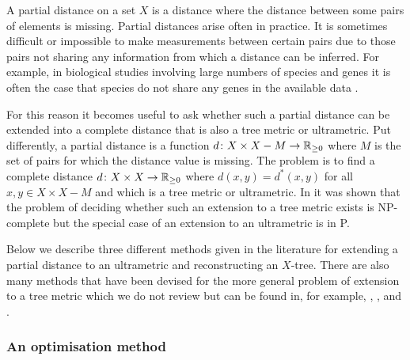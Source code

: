 A partial distance on a set $X$ is a distance where the distance between some
pairs of elements is missing.  Partial distances arise often in practice.  It
is sometimes difficult or impossible to make measurements between certain
pairs due to those pairs not sharing any information from which a distance can
be inferred.  For example, in biological studies involving large numbers of
species and genes it is often the case that species do not share any genes in
the available data \cite{criscuolo2008fastnj}.

For this reason it becomes useful to ask whether such a partial distance can
be extended into a complete distance that is also a tree metric or
ultrametric.  Put differently, a partial distance is a function $d \colon X
\times X - M \to {\mathbb R}_{\geq 0}$ where $M$ is the set of pairs for which the distance
value is missing.  The problem is to find a complete distance $d \colon X
\times X \to {\mathbb R}_{\geq 0}$ where $d(x,y) = d^*(x,y)$ for all $x,y \in X \times X - M$
and which is a tree metric or ultrametric.  In \citep{farach1995robust} it was
shown that the problem of deciding whether such an extension to a tree metric
exists is NP-complete but the special case of an extension to an ultrametric
is in P.

Below we describe three different methods given in the literature for
extending a partial distance to an ultrametric and reconstructing an $X$-tree.
There are also many methods that have been devised for the more general
problem of extension to a tree metric which we do not review but can be found
in, for example, \citep{guenoche1999approximations}, \citep{farach1995robust},
\citep{makarenkov2001nouvelle} and \citep{guenoche2004extension}.

\subsubsection{An optimisation method}
\label{sec:part-dist-optim-method}

